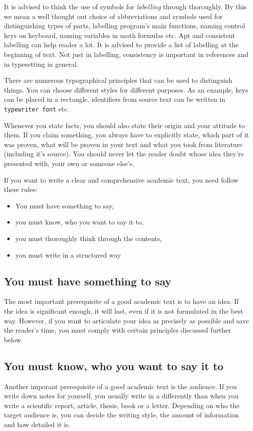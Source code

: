 It is advised to think the use of symbols for {\it labelling} through thoroughly. By this we mean a well thought out choice of abbreviations and symbols used for distinguishing types of parts, labelling program's main functions, naming control keys on keyboard, naming variables in math formulas etc. Apt and consistent labelling can help reader a lot. It is advised to provide a list of labelling at the beginning of text. Not just in labelling, consistency is important in references and in typesetting in general.

There are numerous typographical principles that can be used to distinguish things. You can choose different styles for different purposes. As an example, keys can be placed in a rectangle, identifiers from source text can be written in {\tt typewriter font} etc.

Whenever you state facts, you should also state their origin and your attitude to them. If you claim something, you always have to explicitly state, which part of it was proven, what will be proven in your text and what you took from literature (including it's source). You should never let the reader doubt whose idea they're presented with, your own or someone else's.


If you want to write a clear and comprehensive academic text, you need follow these rules:
\begin{itemize}
\item You must have something to say,
\item you must know, who you want to say it to,
\item you must thoroughly think through the contents,
\item you must write in a structured way 
\end{itemize}

\subsection*{You must have something to say}
The most important prerequisite of a good academic text is to have an idea. If the idea is significant enough, it will last, even if it is not formulated in the best way. However, if you want to articulate your idea as precisely as possible and save the reader's time, you must comply with certain principles discussed further below.

\subsection*{You must know, who you want to say it to}
Another imporant prerequisite of a good academic text is the audience. If you write down notes for yourself, you usually write in a differently than when you write a scientific report, article, thesis, book or a letter. Depending on who the target audience is, you can decide the writing style, the amount of information and how detailed it is. 

